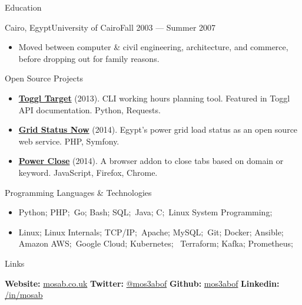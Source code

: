\documentclass[]{mosabcv}
\begin{document}
\begin{cvsection}{Education}
  \begin{cvsubsection}{Cairo, Egypt}{University of Cairo}{Fall 2003 --- Summer 2007}
    \begin{itemize}
      \item Moved between computer \& civil engineering, architecture,
        and commerce, before dropping out for family reasons.
    \end{itemize}
  \end{cvsubsection}
\end{cvsection}

\begin{cvsection}{Open Source Projects}
  \begin{cvsubsection}{}{}{}
    \begin{itemize}
      \item \textbf{\href{https://github.com/mos3abof/toggl_target}{Toggl
        Target}} (2013). CLI working hours planning tool. Featured in Toggl API
        documentation. Python, Requests.
      \item \textbf{\href{https://www.gridstatusnow.com}{Grid Status Now}}
        (2014). Egypt's power grid load status as an open source web service.
        PHP, Symfony.
      \item \textbf{\href{https://power-close.com/}{Power Close}} (2014). A
        browser addon to close tabs based on domain or keyword. JavaScript,
        Firefox, Chrome.
    \end{itemize}
  \end{cvsubsection}
\end{cvsection}

\begin{cvsection}{Programming Languages \& Technologies}
  \begin{cvsubsection}{}{}{}
    \begin{itemize}
      \item Python; PHP;\ Go; Bash; SQL;\ Java; C;\ Linux System Programming;
      \item Linux; Linux Internals; TCP/IP;\ Apache; MySQL;\ Git; Docker;
        Ansible; Amazon AWS;\ Google Cloud; Kubernetes; \ Terraform; Kafka;
        Prometheus;
    \end{itemize}
  \end{cvsubsection}
\end{cvsection}

\begin{cvsection}{Links}
  \begin{cvsubsection}{}{}{}
      \textbf{Website:}
        \href{https://mosab.co.uk}{mosab.co.uk}
      \textbf{ Twitter:}
        \href{https://twitter.com/mos3abof}{@mos3abof}
      \textbf{ Github:}
        \href{https://github.com/mos3abof}{mos3abof}
      \textbf{ Linkedin:}
        \href{https://www.linkedin.com/in/mosab}{/in/mosab}
  \end{cvsubsection}
\end{cvsection}
\end{document}
